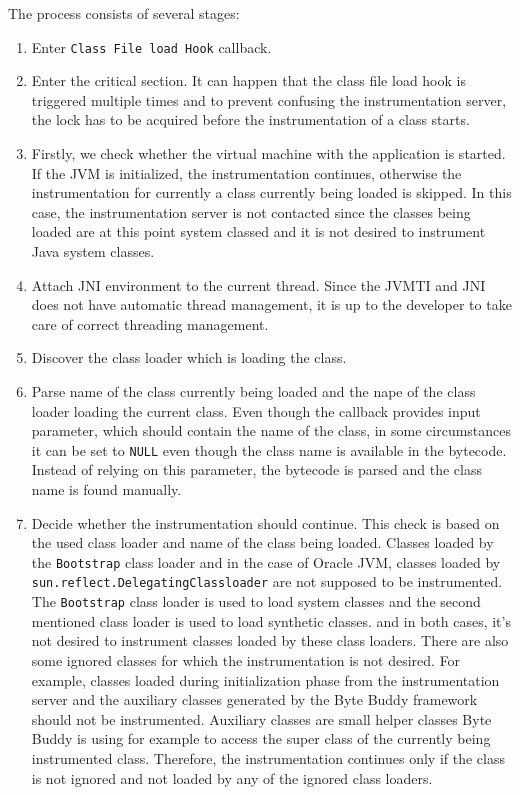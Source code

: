 The process consists of several stages:
\begin{enumerate}
	\item Enter \texttt{Class File load Hook} callback.
	\item Enter the critical section. It can happen that the class file load hook is triggered multiple times and to prevent confusing the instrumentation server, the lock has to be acquired before the instrumentation of a class starts.
	\item Firstly, we check whether the virtual machine with the application is \linebreak started. If the JVM is initialized, the instrumentation continues, otherwise the instrumentation for currently a class currently being loaded is skipped. In this case, the instrumentation server is not contacted since the classes being loaded are at this point system classed and it is not desired to instrument Java system classes.
	\item Attach JNI environment to the current thread. Since the JVMTI and JNI does not have automatic thread management, it is up to the developer to take care of correct threading management.
	\item Discover the class loader which is loading the class.
	\item Parse name of the class currently being loaded and the nape of the class loader loading the current class. Even though the callback provides input parameter, which should contain the name of the class, in some circumstances it can be set to \texttt{NULL} even though the class name is available in the bytecode. Instead of relying on this parameter, the bytecode is parsed and the class name is found manually.
	\item Decide whether the instrumentation should continue. This check is based on the used class loader and name of the class being loaded. Classes loaded by the \texttt{Bootstrap} class loader and in the case of Oracle JVM, classes loaded by \texttt{sun.reflect.DelegatingClassloader} are not supposed to be instrumented. 
	The \texttt{Bootstrap} class loader is used to load system classes and the second mentioned class loader is used to load synthetic classes. and in both cases, it's not desired to instrument classes loaded by these class loaders.
	There are also some ignored classes for which the instrumentation is not desired. For example, classes loaded during initialization phase from the instrumentation server and the auxiliary classes generated by the Byte Buddy framework should not be instrumented. Auxiliary classes are small helper classes Byte Buddy is using for example to access the super class of the currently being instrumented class. Therefore, the instrumentation continues only if the class is not ignored and not loaded by any of the ignored class loaders.
	

\end{enumerate}
